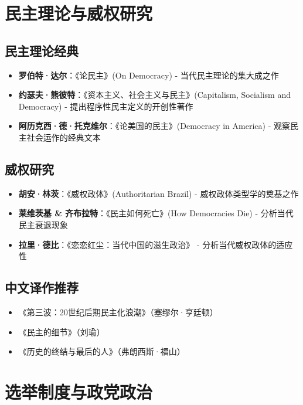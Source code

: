 \section{民主理论与威权研究}

\subsection{民主理论经典}
\begin{itemize}
    \item \textbf{罗伯特·达尔}：《论民主》(On Democracy)
    \quad - 当代民主理论的集大成之作
    \item \textbf{约瑟夫·熊彼特}：《资本主义、社会主义与民主》(Capitalism, Socialism and Democracy)
    \quad - 提出程序性民主定义的开创性著作
    \item \textbf{阿历克西·德·托克维尔}：《论美国的民主》(Democracy in America)
    \quad - 观察民主社会运作的经典文本
\end{itemize}

\subsection{威权研究}
\begin{itemize}
    \item \textbf{胡安·林茨}：《威权政体》(Authoritarian Brazil)
    \quad - 威权政体类型学的奠基之作
    \item \textbf{莱维茨基 \& 齐布拉特}：《民主如何死亡》(How Democracies Die)
    \quad - 分析当代民主衰退现象
    \item \textbf{拉里·德比}：《恋恋红尘：当代中国的滋生政治》
    \quad - 分析当代威权政体的适应性
\end{itemize}

\subsection{中文译作推荐}
\begin{itemize}
    \item 《第三波：20世纪后期民主化浪潮》（塞缪尔·亨廷顿）
    \item 《民主的细节》（刘瑜）
    \item 《历史的终结与最后的人》（弗朗西斯·福山）
\end{itemize}

\section{选举制度与政党政治}

